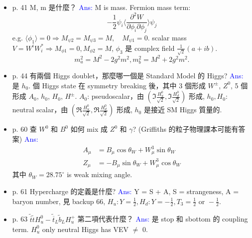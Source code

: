 \documentclass[12pt, letterpaper]{article}
\begin{document}
\begin{itemize}
\item p. 41\newline
M, m 是什麼？\newline
\textcolor{blue}{Ans:} M is mass.\newline
Fermion mass term:
\begin{equation*}
-\frac{1}{2} \psi_{i} \langle \frac{\partial^{2} W}{\partial \phi_{i} \partial \phi_{j}} \rangle \psi_{j}
\end{equation*}
e.g. $\langle \phi_{1} \rangle = 0 \Rightarrow M_{\psi 2} = M_{\psi 3} = M, \quad M_{\psi 1} = 0$.\newline
scalar mass $V = W^{i} W^{*}_{i} \Rightarrow M_{\phi 1} = 0, M_{\phi 2} = M$, $\phi_3$ 是 complex field $\frac{1}{\sqrt{2}}(a + i b)$.
\begin{equation*}
m^2_{a} = M^{2} - 2 g^{2} m^{2}, m^{2}_{b} = M^{2} + 2 g^{2} m^{2}.
\end{equation*}


\item p. 44\newline
有兩個 Higgs doublet，那麼哪一個是 Standard Model 的 Higgs?\newline
\textcolor{blue}{Ans:} 是 $h_{0}$. 個 Higgs state 在 symmetry breaking 後，其中 3 個形成 $W^{\pm}$, $Z^{0}$, 5 個形成 $A_{0}$, $h_{0}$, $H_{0}$, $H^{\pm}$.\newline
$A_{0}$: pseudoscalar，由 $(\Im \frac{H^{0}_{u}}{\sqrt{2}}, \Im \frac{H^{0}_{d}}{\sqrt{2}})$ 形成,\newline
$h_{0}, H_{0}$: neutral scalar，由 $(\Re \frac{H^{0}_{u}}{\sqrt{2}}, \Re\frac{H^{0}_{d}}{\sqrt{2}})$ 形成,\newline
$h_{0}$ 是接近 SM Higgs 質量的.

\item p. 60\newline
查 $W^{0}$ 和 $B^{0}$ 如何 mix 成 $Z^{0}$ 和 $\gamma$? (Griffiths 的粒子物理課本可能有答案)\newline
\textcolor{blue}{Ans:}
\begin{align*}
A_{\mu} &= B_{\mu} \cos \theta_{W} + W^{3}_{\mu} \sin \theta_{W}\\
Z_{\mu} &= -B_{\mu} \sin \theta_{W} + W^3_{\mu} \cos \theta_{W}
\end{align*}
其中 $\theta_{W} = 28.75^{\circ}$ is weak mixing angle.

\item p. 61\newline
Hypercharge 的定義是什麼?\newline
\textcolor{blue}{Ans:} Y = S + A, S = strangeness, A = baryon number, 見 backup 66,
$H_{u}: Y = \frac{1}{2}, H_{d}: Y = - \frac{1}{2}, T_{3} = \frac{1}{2} \textrm{ or } -\frac{1}{2}$.


\item p. 63\newline
$\tilde{\overline{t}} \tilde{t} H^{0}_{u} - \tilde{\overline{t}}_{L} \tilde{b}_{L} H^{+}_{u}$ 第二項代表什麼？\newline
\textcolor{blue}{Ans:} 是 stop 和 sbottom 的 coupling term.
$H^0_{u}$ only neutral Higgs has VEV $\neq$ 0.

\end{itemize}
\end{document}
